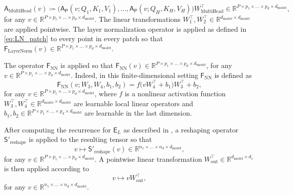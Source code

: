 \documentclass[twoside]{article}
\newcommand{\1}{\mathbbm{1}}
\newcommand{\R}{\mathbbm{R}}
\newcommand{\sA}{\mathsf{A}}
\newcommand{\sAp}{\mathsf{A}_{\mathsf{P}}}
\newcommand{\sF}{\mathsf{F}}
\newcommand{\sE}{\mathsf{E}}
\newcommand{\sS}{\mathsf{S}}
\providecommand{\mathbbm}{\mathbb} %
\begin{document}
\begin{equation}
\label{eq:multihead_implement_operator}
    \sA_{\textrm{MultiHead}}(v) \coloneqq  \bigl(\sAp(v;{Q}_1,{K}_1,{V}_1),\ldots, \sAp(v;{Q}_H,{K}_H,{V}_H)  \bigr) W_{\textrm{MultiHead}}^\top \in \R^{P\times p_1\times \ldots\times p_d\times d_{\textrm{model}}},
\end{equation}
for any $v\in \R^{P\times p_1\times \ldots\times p_d\times d_{\textrm{model}}}$. The linear transformations $W_1^\top,W_2^\top\in\R^{d_{\textrm{model}}\times d_{\textrm{model}}}$ are applied pointwise. The layer normalization operator is applied as defined in \eqref{eq:LN_patch} to every point in every patch so that $\sF_{\textrm{LayerNorm}}(v)\in \R^{P\times p_1 \times \ldots \times p_d \times d_{\textrm{model}}} $. 

The operator $\sF_{\textrm{NN}}$ is applied so that $\sF_{\textrm{NN}}(v)\in \R^{P\times p_1 \times \ldots \times p_d \times d_{\textrm{model}}}$, for any $v\in \R^{P\times p_1 \times \ldots \times p_d \times d_{\textrm{model}}}$. Indeed, in this finite-dimensional setting $\sF_\textrm{NN}$ is defined as
\begin{equation}
\label{eq:NN_patch}
    \sF_\textrm{NN}(v;W_3,W_4,b_1,b_2) = f\bigl(vW_4^\top+b_1\bigr)W_3^\top + b_2,
\end{equation}
for any $v\in \R^{P\times p_1 \times \ldots \times p_d \times d_{\textrm{model}}}$, where $f$ is a nonlinear activation function $W_3^\top,W_4^\top\in\R^{d_\textrm{model}\times d_\textrm{model}}$ are learnable local linear operators and $b_1,b_2 \in \R^{P\times p_1 \times \ldots \times p_d \times d_{\textrm{model}}}$ are learnable in the last dimension.

After computing the recurrence for $\sE_L$ as described in , a reshaping operator $\sS'_{\textrm{reshape}}$ is applied to the resulting tensor so that 
\begin{equation}
\label{eq:s'r_impl}
    v \mapsto \sS'_{\textrm{reshape}} (v) \in \R^{n_1 \times \ldots \times n_d \times d_{\textrm{model}} },
\end{equation}
for any $v\in \R^{{P\times p_1\times \ldots\times p_d\times d_{\textrm{model}}}}$. A pointwise linear transformation $W_{\textrm{out}}^\top\in \R^{ d_{\textrm{model}}\times d_z}$ is then applied according to 
\begin{equation}
\label{eq:w_out_impl}
v \mapsto vW_{\textrm{out}}^\top,
\end{equation}
for any $v\in\R^{n_1 \times \ldots \times n_d \times d_{\textrm{model}} }$.
\end{document}
